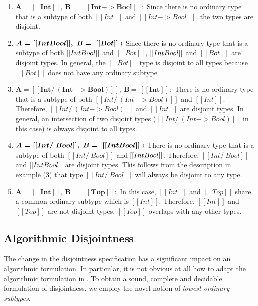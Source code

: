 \begin{enumerate}
  \item $\boldsymbol{A = [[Int]], \ B = \ [[Int -> Bool]]:}$ Since there is no ordinary type that is a subtype of both $[[Int]]$ and $[[Int -> Bool]]$,
        the two types are disjoint.
  \item $\boldsymbol{A = [[Int \/ Bool]], \ B = \ [[Bot]]:}$ Since there is no ordinary type that is a subtype of both $[[Int \/ Bool]]$ and $[[Bot]]$,
    $[[Int \/ Bool]]$ and $[[Bot]]$ are disjoint types.
    In general, the $[[Bot]]$ type is disjoint to all types because $[[Bot]]$ does not
    have any ordinary subtype.
  \item $\boldsymbol{A = [[Int /\ (Int -> Bool)]], \ B = \ [[Int]]:}$ There is no ordinary type that is a subtype of both $[[Int /\ (Int -> Bool)]]$ and $[[Int]]$.
        Therefore, $[[Int /\ (Int -> Bool)]]$ and $[[Int]]$ are disjoint types.
        In general, an intersection of two disjoint types ($[[Int /\ (Int -> Bool)]]$ in this case)
        is always disjoint to all types.
  \item $\boldsymbol{A = [[Int /\ Bool]], \ B = \ [[Int \/ Bool]]:}$ There is no ordinary type that is a subtype of both $[[Int /\ Bool]]$ and $[[Int \/ Bool]]$.
        Therefore, $[[Int /\ Bool]]$ and $[[Int \/ Bool]]$ are disjoint types.
        This follows from the description in example (3) that type $[[Int /\ Bool]]$ will always be
        disjoint to any type.
  \item $\boldsymbol{A = [[Int]], \ B = \ [[Top]]:}$ In this case, $[[Int]]$ and $[[Top]]$ share a common ordinary subtype which is $[[Int]]$.
    Therefore, $[[Int]]$ and $[[Top]]$ are not disjoint types.
     $[[Top]]$ overlaps with any other types.
\end{enumerate}


\subsection{Algorithmic Disjointness}

The change in the disjointness specification has a significant impact on an
algorithmic formulation. In particular, it is not obvious at all how to adapt
the algorithmic formulation in . To obtain a
sound, complete and decidable formulation of disjointness, we employ the novel
notion of \emph{lowest ordinary subtypes}.

